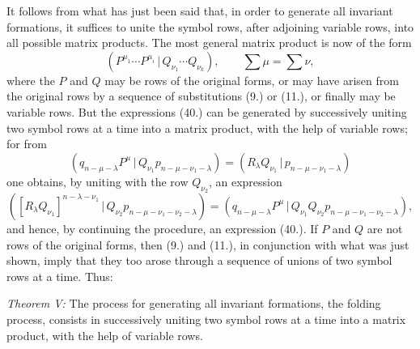 \documentclass[11pt]{article}
\providecommand{\pair}[2]{(#1\,|\,#2)}
\begin{document}
It follows from what has just been said that, in order to generate all invariant formations, it suffices to unite the symbol rows, after adjoining variable rows, into all possible matrix products. The most general matrix product is now of the form
\begin{equation}
 \pair{P^{\mu_1}\cdots P^{\mu_i}}{Q_{\nu_1}\cdots Q_{\nu_k}},\qquad \sum\mu=\sum\nu,
\tag{40}
\end{equation}
where the $P$ and $Q$ may be rows of the original forms, or may have arisen from the original rows by a sequence of substitutions (9.) or (11.), or finally may be variable rows. But the expressions (40.) can be generated by successively uniting two symbol rows at a time into a matrix product, with the help of variable rows; for from
\[
 \pair{q_{n-\mu-\lambda}P^\mu}{Q_{\nu_1}p_{n-\mu-\nu_1-\lambda}}=\pair{R_\lambda Q_{\nu_1}}{p_{n-\mu-\nu_1-\lambda}}
\]
one obtains, by uniting with the row $Q_{\nu_2}$, an expression
\[
 \pair{[R_\lambda Q_{\nu_1}]^{n-\lambda-\nu_1}}{Q_{\nu_2}p_{n-\mu-\nu_1-\nu_2-\lambda}}
 =\pair{q_{n-\mu-\lambda}P^\mu}{Q_{\nu_1}Q_{\nu_2}p_{n-\mu-\nu_1-\nu_2-\lambda}},
\]
and hence, by continuing the procedure, an expression (40.). If $P$ and $Q$ are not rows of the original forms, then (9.) and (11.), in conjunction with what was just shown, imply that they too arose through a sequence of unions of two symbol rows at a time. Thus:

\emph{Theorem V:} The process for generating all invariant formations, the folding process, consists in successively uniting two symbol rows at a time into a matrix product, with the help of variable rows.
\end{document}
